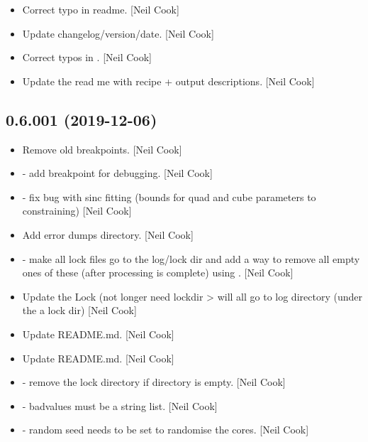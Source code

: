 \documentclass[a4paper,10pt,english]{report}
\begin{document}
\begin{itemize}
\item {} 
Correct typo in readme. {[}Neil Cook{]}

\item {} 
Update changelog/version/date. {[}Neil Cook{]}

\item {} 
Correct typos in . {[}Neil Cook{]}

\item {} 
Update the read me with recipe + output descriptions. {[}Neil Cook{]}

\end{itemize}


\subsection{0.6.001 (2019-12-06)}
\label{\detokenize{misc/changelog:id17}}\begin{itemize}
\item {} 
Remove old breakpoints. {[}Neil Cook{]}

\item {} 
 - add breakpoint for debugging. {[}Neil Cook{]}

\item {} 
 - fix bug with sinc fitting (bounds for quad and cube
parameters to constraining) {[}Neil Cook{]}

\item {} 
Add error dumps directory. {[}Neil Cook{]}

\item {} 
 - make all lock files go to the log/lock dir and add a
way to remove all empty ones of these (after processing is complete)
using . {[}Neil Cook{]}

\item {} 
Update the Lock (not longer need lockdir \textendash{}\textgreater{} will all go to log
directory (under the a lock dir) {[}Neil Cook{]}

\item {} 
Update README.md. {[}Neil Cook{]}

\item {} 
Update README.md. {[}Neil Cook{]}

\item {} 
 - remove the lock directory if directory is empty.
{[}Neil Cook{]}

\item {} 
 - badvalues must be a string list. {[}Neil Cook{]}

\item {} 
 - random seed needs to be set to randomise
the cores. {[}Neil Cook{]}

\end{itemize}
\end{document}
